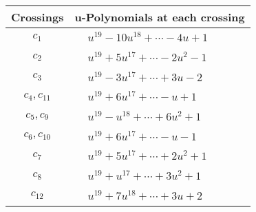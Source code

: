 \documentclass[1p]{elsarticle_modified}
\theoremstyle{definition}
\begin{document}
\begin{tabular}{m{50pt}|m{274pt}}
Crossings & \hspace{64pt}u-Polynomials at each crossing \\
\hline $$\begin{aligned}c_{1}\end{aligned}$$&$\begin{aligned}
&u^{19}-10 u^{18}+\cdots-4 u+1
\end{aligned}$\\
\hline $$\begin{aligned}c_{2}\end{aligned}$$&$\begin{aligned}
&u^{19}+5 u^{17}+\cdots-2 u^2-1
\end{aligned}$\\
\hline $$\begin{aligned}c_{3}\end{aligned}$$&$\begin{aligned}
&u^{19}-3 u^{17}+\cdots+3 u-2
\end{aligned}$\\
\hline $$\begin{aligned}c_{4},c_{11}\end{aligned}$$&$\begin{aligned}
&u^{19}+6 u^{17}+\cdots- u+1
\end{aligned}$\\
\hline $$\begin{aligned}c_{5},c_{9}\end{aligned}$$&$\begin{aligned}
&u^{19}- u^{18}+\cdots+6 u^2+1
\end{aligned}$\\
\hline $$\begin{aligned}c_{6},c_{10}\end{aligned}$$&$\begin{aligned}
&u^{19}+6 u^{17}+\cdots- u-1
\end{aligned}$\\
\hline $$\begin{aligned}c_{7}\end{aligned}$$&$\begin{aligned}
&u^{19}+5 u^{17}+\cdots+2 u^2+1
\end{aligned}$\\
\hline $$\begin{aligned}c_{8}\end{aligned}$$&$\begin{aligned}
&u^{19}+u^{17}+\cdots+3 u^2+1
\end{aligned}$\\
\hline $$\begin{aligned}c_{12}\end{aligned}$$&$\begin{aligned}
&u^{19}+7 u^{18}+\cdots+3 u+2
\end{aligned}$\\
\hline
\end{tabular}\\~\\
\end{document}
